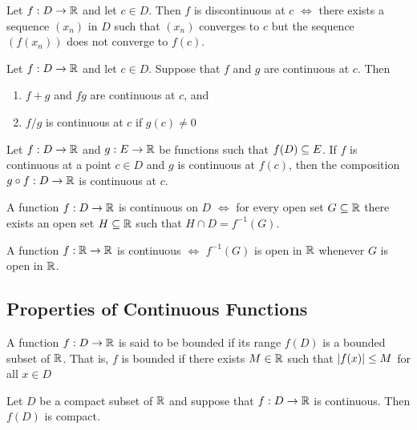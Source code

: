 \documentclass[12pt]{article}
\begin{document}
\begin{theorem}
  Let $f : D \rightarrow \mathbb{R}$ and let $c \in D$. Then $f$ is discontinuous at
  $c$ $\iff$ there exists a sequence $(x_n)$ in $D$ such that $(x_n)$ converges
  to $c$ but the sequence $(f(x_n))$ does not converge to $f(c)$.
\end{theorem}

\begin{theorem}
  Let $f : D \rightarrow \mathbb{R}$ and let $c \in D$. Suppose that $f$ and $g$ are
  continuous at $c$. Then
  \begin{enumerate}
  \item $f + g$ and $fg$ are continuous at $c$, and
  \item $f / g$ is continuous at $c$ if $g(c) \ne 0$
  \end{enumerate}
\end{theorem}

\begin{theorem}
  Let $f : D \rightarrow \mathbb{R}$ and $g : E \rightarrow \mathbb{R}$ be functions such
  that $f(D) \subseteq E$. If $f$ is continuous at a point $c \in D$ and $g$ is
  continuous at $f(c)$, then the composition $g \circ f : D \rightarrow \mathbb{R}$
  is continuous at $c$.
\end{theorem}

\begin{theorem}
  A function $f : D \rightarrow \mathbb{R}$ is continuous on $D$ $\iff$ for every
  open set $G \subseteq \mathbb{R}$ there exists an open set $H \subseteq \mathbb{R}$ such that $H \cap
  D = f^{-1}(G)$.
\end{theorem}

\begin{corollary}
  A function $f: \mathbb{R} \rightarrow \mathbb{R}$ is continuous $\iff$ $f^{-1}(G)$ is
  open in $\mathbb{R}$ whenever $G$ is open in $\mathbb{R}$.
\end{corollary}

\subsection{Properties of Continuous Functions}
\label{sec:org19f4222}
\begin{definition}[Bounded]
  A function $f: D \rightarrow \mathbb{R}$ is said to be bounded if its range $f(D)$
  is a bounded subset of $\mathbb{R}$. That is, $f$ is bounded if there exists $M \in
  \mathbb{R}$ such that $\left|f(x)\right| \le M$ for all $x \in D$
\end{definition}

\begin{theorem}
  Let $D$ be a compact subset of $\mathbb{R}$ and suppose that $f : D \rightarrow
  \mathbb{R}$ is continuous. Then $f(D)$ is compact.
\end{theorem}
\end{document}
